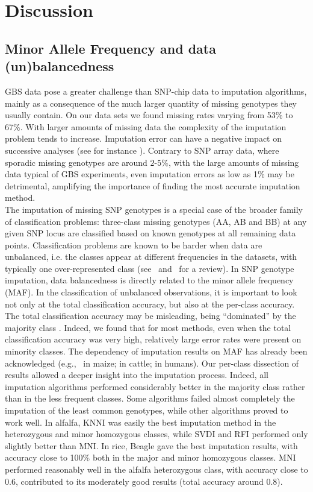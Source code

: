 \section{Discussion}
\label{sec:discussion}

\subsection{Minor Allele Frequency and data (un)balancedness}
\label{sec:maf}
GBS data pose a greater challenge than SNP-chip data to imputation algorithms, mainly as a consequence of the much larger quantity of missing genotypes they usually contain. On our data sets we found missing rates varying from 53\% to 67\%. With larger amounts of missing data the complexity of the imputation problem tends to increase. Imputation error can have a negative impact on successive analyses (see for instance \cite{rutkoski_imputation_2013}). Contrary to SNP array data, where sporadic missing genotypes are around $2$-$5\%$, with the large amounts of missing data typical of GBS experiments, even imputation errors as low as 1\% may be detrimental, amplifying the importance of finding the most accurate imputation method.\\
The imputation of missing SNP genotypes is a special case of the broader family of classification problems: three-class missing genotypes (AA, AB and BB) at any given SNP locus are classified based on known genotypes at all remaining data points. Classification problems are known to be harder when data are unbalanced, i.e. the classes appear at different frequencies in the datasets, with typically one over-represented class
(see~\cite{kotsiantis_handling_2006}
and~\cite{sun_classification_2009} for a review). In SNP genotype imputation, data balancedness is directly related to the minor allele frequency (MAF). In the classification of unbalanced observations, it is important to look not only at the total classification accuracy, but also at the per-class accuracy. The total classification accuracy may be misleading, being ``dominated'' by the majority class
\cite{he_learning_2009}.
Indeed, we found that for most methods, even when the total classification accuracy was very high, relatively large error rates were present on minority classes. 
The dependency of imputation results on MAF has already been acknowledged  (e.g.,~\cite{hickey_factors_2012} in maize; \cite{ma_comparison_2013} in cattle; \cite{pei_analyses_2008} in humans). Our per-class dissection of results allowed a deeper insight into the imputation process. Indeed, all imputation algorithms performed considerably better in the majority class rather than in the less frequent classes.
Some algorithms failed almost completely the imputation of the least common genotypes, while other algorithms proved to work well. In alfalfa, KNNI was easily the best imputation method in the heterozygous and minor homozygous classes, while SVDI and RFI performed only slightly better than MNI. In rice, Beagle gave the best imputation results, with accuracy close to 100\% both in the major and minor homozygous classes. MNI performed reasonably well in the alfalfa heterozygous class, with accuracy close to 0.6, contributed to its moderately good results (total accuracy around 0.8).

